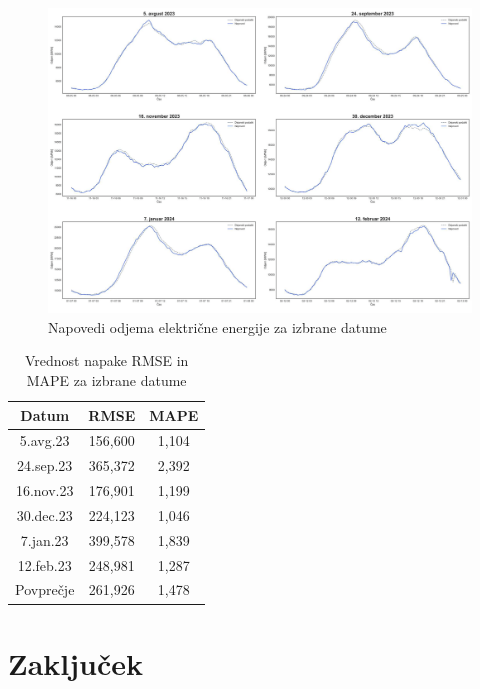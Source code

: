 \documentclass[a4paper, 11pt]{article}
\begin{document}
\begin{figure}[h!]
    \centering
    \caption{Napovedi odjema električne energije za izbrane datume}\par\medskip
    \label{fig:napovedi_vse}
    \includegraphics[width=\textwidth]{napovedi_vse.png}
\end{figure}

\begin{table}[!ht]
    \centering
    \caption{Vrednost napake RMSE in MAPE za izbrane datume}\par\medskip
    \label{Tab:RMSE_MAPE}
    \begin{tabular}{c|c|c}
        Datum & RMSE & MAPE \\ \hline
        5.avg.23 & 156,600 & 1,104 \\ 
        24.sep.23 & 365,372 & 2,392 \\ 
        16.nov.23 & 176,901 & 1,199 \\ 
        30.dec.23 & 224,123 & 1,046 \\ 
        7.jan.23 & 399,578 & 1,839 \\ 
        12.feb.23 & 248,981 & 1,287 \\ \hline
        Povprečje & 261,926 & 1,478 \\ 
    \end{tabular}
\end{table}






\section{Zaključek}




\pagebreak



\end{document}
